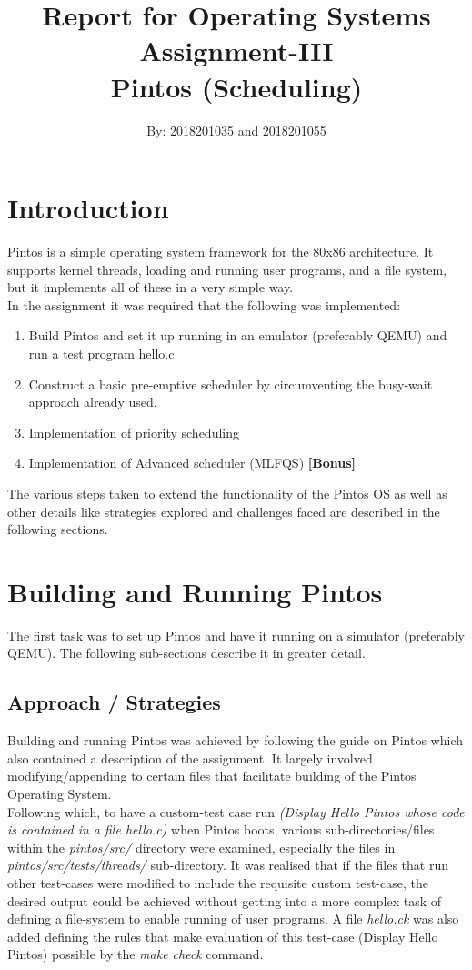 \documentclass[]{article}
\title{Report for Operating Systems Assignment-III\\Pintos (Scheduling)}
\author{By: 2018201035 and 2018201055}
\date{}
\begin{document}
\maketitle
\newpage
\tableofcontents
\listoffigures
\newpage
{}
\setcounter{page}{1}
\renewcommand{\thefigure}{\thesection-\arabic{figure}}
\section{Introduction}
	Pintos is a simple operating system framework for the 80x86 architecture. It supports kernel threads, loading and running user programs, and a file system, but it implements all of these in a very simple way\cite{1}.\\ 
	In the assignment it was required that the following was implemented:
	\begin{enumerate}
		\item Build Pintos and set it up running in an emulator (preferably QEMU) and run a test program hello.c
		\item Construct a basic pre-emptive scheduler by circumventing the busy-wait approach already used.
		\item Implementation of priority scheduling
		\item Implementation of Advanced scheduler (MLFQS) \textbf{[Bonus]}
	\end{enumerate}
	The various steps taken to extend the functionality of the Pintos OS as well as other details like strategies explored and challenges faced are described in the following sections.
	
\section{Building and Running Pintos}
	The first task was to set up Pintos and have it running on a simulator (preferably QEMU). The following sub-sections describe it in greater detail.
	\subsection{Approach / Strategies}
		Building and running Pintos	was achieved by following the guide on Pintos which also contained a description of the assignment\cite{2}. It largely involved modifying/appending to certain files that facilitate building of the Pintos Operating System.\\
		Following which, to have a custom-test case run \textit{(Display Hello Pintos whose code is contained in a file hello.c)} when Pintos boots, various sub-directories/files within the \textit{pintos/src/} directory were examined, especially the files in \textit{pintos/src/tests/threads/} sub-directory. It was realised that if the files that run other test-cases were modified to include the requisite custom test-case, the desired output could be achieved without getting into a more complex task of defining a file-system to enable running of user programs. A file \textit{hello.ck} was also added defining the rules that make evaluation of this test-case (Display Hello Pintos) possible by the \textit{make check} command.
\end{document}
